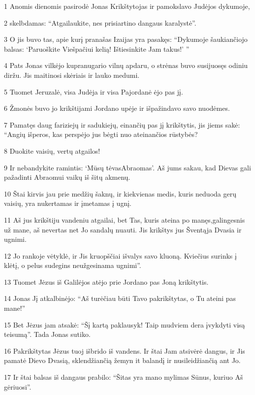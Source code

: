 \par 1 Anomis dienomis pasirodė Jonas Krikštytojas ir pamokslavo Judėjos dykumoje, 
\par 2 skelbdamas: “Atgailaukite, nes prisiartino dangaus karalystė”. 
\par 3 O jis buvo tas, apie kurį pranašas Izaijas yra pasakęs: “Dykumoje šaukiančiojo balsas: ‘Paruoškite Viešpačiui kelią! Ištiesinkite Jam takus!’ ” 
\par 4 Pats Jonas vilkėjo kupranugario vilnų apdaru, o strėnas buvo susijuosęs odiniu diržu. Jis maitinosi skėriais ir lauko medumi. 
\par 5 Tuomet Jeruzalė, visa Judėja ir visa Pajordanė ėjo pas jį. 
\par 6 Žmonės buvo jo krikštijami Jordano upėje ir išpažindavo savo nuodėmes. 
\par 7 Pamatęs daug fariziejų ir sadukiejų, einančių pas jį krikštytis, jis jiems sakė: “Angių išperos, kas perspėjo jus bėgti nuo ateinančios rūstybės? 
\par 8 Duokite vaisių, vertų atgailos! 
\par 9 Ir nebandykite ramintis: ‘Mūsų tėvas­Abraomas’. Aš jums sakau, kad Dievas gali pažadinti Abraomui vaikų iš šitų akmenų. 
\par 10 Štai kirvis jau prie medžių šaknų, ir kiekvienas medis, kuris neduoda gerų vaisių, yra nukertamas ir įmetamas į ugnį. 
\par 11 Aš jus krikštiju vandeniu atgailai, bet Tas, kuris ateina po manęs,­galingesnis už mane, aš nevertas net Jo sandalų nuauti. Jis krikštys jus Šventąja Dvasia ir ugnimi. 
\par 12 Jo rankoje vėtyklė, ir Jis kruopščiai išvalys savo kluoną. Kviečius surinks į klėtį, o pelus sudegins neužgesinama ugnimi”. 
\par 13 Tuomet Jėzus iš Galilėjos atėjo prie Jordano pas Joną krikštytis. 
\par 14 Jonas Jį atkalbinėjo: “Aš turėčiau būti Tavo pakrikštytas, o Tu ateini pas mane!” 
\par 15 Bet Jėzus jam atsakė: “Šį kartą paklausyk! Taip mudviem dera įvykdyti visą teisumą”. Tada Jonas sutiko. 
\par 16 Pakrikštytas Jėzus tuoj išbrido iš vandens. Ir štai Jam atsivėrė dangus, ir Jis pamatė Dievo Dvasią, sklendžiančią žemyn it balandį ir nusileidžiančią ant Jo. 
\par 17 Ir štai balsas iš dangaus prabilo: “Šitas yra mano mylimas Sūnus, kuriuo Aš gėriuosi”.



